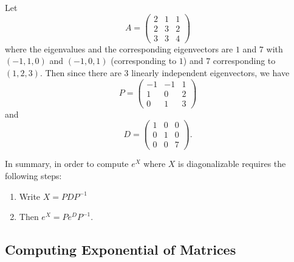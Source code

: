 \begin{eg}
   Let  
   \[  A = \begin{pmatrix} 2 & 1 & 1 \\ 2 & 3 & 2 \\ 3 & 3 & 4  \end{pmatrix}  \] 
   where the eigenvalues and the corresponding eigenvectors are \( 1  \) and \(  7  \) with 
   \( (-1,1,0) \) and \( (-1,0,1) \) (corresponding to \( 1 \)) and \( 7  \) corresponding to \( (1,2,3) \). Then since there are \( 3  \) linearly independent eigenvectors, we have
   \[  P = \begin{pmatrix} -1 & -1 & 1 \\ 1 & 0 & 2 \\ 0 & 1 & 3  \end{pmatrix}  \]
   and
   \[  D = \begin{pmatrix} 1 & 0 & 0 \\ 0 & 1 & 0 \\ 0 & 0 & 7 \end{pmatrix}.  \]
\end{eg}

In summary, in order to compute \( e^{X} \) where \( X  \) is diagonalizable requires the following steps:
\begin{enumerate}
    \item[(1)] Write \( X = P D P^{-1} \)
    \item[(2)] Then \( e^{X} = P e^{D} P^{-1} \).
\end{enumerate}

\subsection{Computing Exponential of Matrices}

